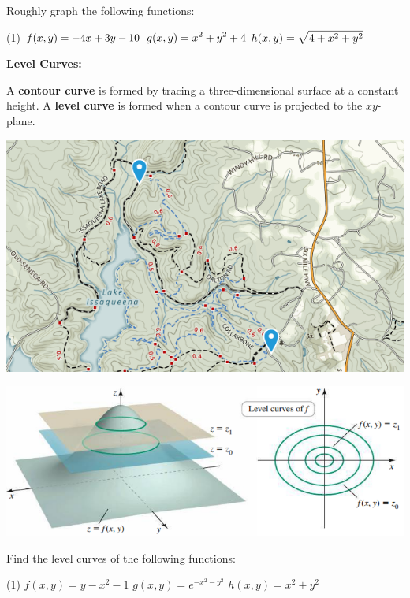 \documentclass[mathNotesPreamble]{subfiles}
\begin{document}
  \begin{ex*}
    Roughly graph the following functions:
  \end{ex*}
  \begin{tasks}[after-item-skip=\stretch{1}, label=](1)
    \task $\displaystyle f(x,y)=-4x+3y-10$
    \task $\displaystyle g(x,y)=x^2+y^2+4$
    \task $\displaystyle h(x,y)=\sqrt{4+x^2+y^2}$
  \end{tasks}
  \pagebreak

  \textbf{Level Curves:}

  A \textbf{contour curve} is formed by tracing a three-dimensional surface at a constant height. A \textbf{level curve} is formed when a contour curve is projected to the $xy$-plane.
  \begin{center}
    \includegraphics[width=0.75\linewidth]{images/cuExperForestTopoMap}
  \end{center}

  \begin{center}
    \includegraphics[width=0.8\linewidth]{images/briggs_15_01/fig15_10}
  \end{center}
  \pagebreak

  \begin{ex*}
    Find the level curves of the following functions:
  \end{ex*}
  \begin{tasks}[after-item-skip=\stretch{1}, label=](1)
    \task $f(x,y)=y-x^2-1$
    \task $g(x,y)=e^{-x^2-y^2}$
    \task $h(x,y)=x^2+y^2$
  \end{tasks}
  \pagebreak
\end{document}
